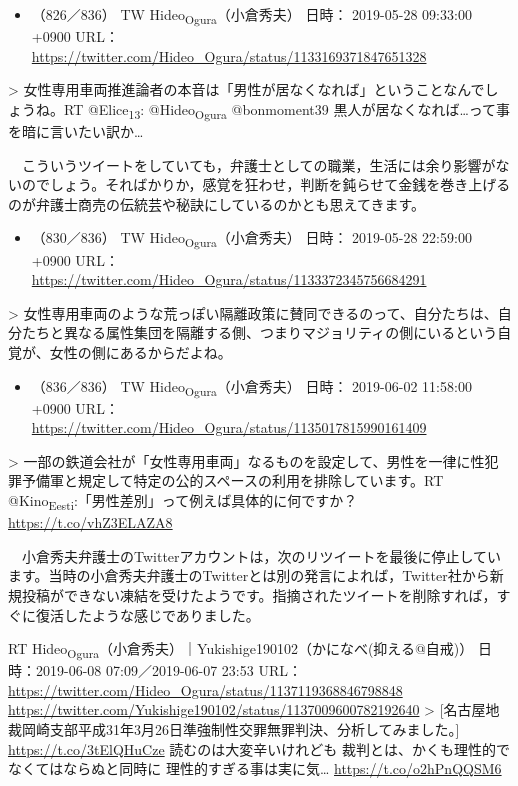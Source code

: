 \documentclass[]{ltjarticle}
\begin{document}
\begin{itemize}
\item （826／836） TW Hideo\textsubscript{Ogura}（小倉秀夫） 日時： 2019-05-28 09:33:00 +0900 URL： \url{https://twitter.com/Hideo\_Ogura/status/1133169371847651328}
\end{itemize}

> 女性専用車両推進論者の本音は「男性が居なくなれば」ということなんでしょうね。RT @Elice\textsubscript{13}: @Hideo\textsubscript{Ogura} @bonmoment39 黒人が居なくなれば…って事を暗に言いたい訳か…

　こういうツイートをしていても，弁護士としての職業，生活には余り影響がないのでしょう。そればかりか，感覚を狂わせ，判断を鈍らせて金銭を巻き上げるのが弁護士商売の伝統芸や秘訣にしているのかとも思えてきます。

\begin{itemize}
\item （830／836） TW Hideo\textsubscript{Ogura}（小倉秀夫） 日時： 2019-05-28 22:59:00 +0900 URL： \url{https://twitter.com/Hideo\_Ogura/status/1133372345756684291}
\end{itemize}

> 女性専用車両のような荒っぽい隔離政策に賛同できるのって、自分たちは、自分たちと異なる属性集団を隔離する側、つまりマジョリティの側にいるという自覚が、女性の側にあるからだよね。

\begin{itemize}
\item （836／836） TW Hideo\textsubscript{Ogura}（小倉秀夫） 日時： 2019-06-02 11:58:00 +0900 URL： \url{https://twitter.com/Hideo\_Ogura/status/1135017815990161409}
\end{itemize}

> 一部の鉄道会社が「女性専用車両」なるものを設定して、男性を一律に性犯罪予備軍と規定して特定の公的スペースの利用を排除しています。RT @Kino\textsubscript{Eesti}:「男性差別」って例えば具体的に何ですか？ \url{https://t.co/vhZ3ELAZA8}

　小倉秀夫弁護士のTwitterアカウントは，次のリツイートを最後に停止しています。当時の小倉秀夫弁護士のTwitterとは別の発言によれば，Twitter社から新規投稿ができない凍結を受けたようです。指摘されたツイートを削除すれば，すぐに復活したような感じでありました。

RT Hideo\textsubscript{Ogura}（小倉秀夫）｜Yukishige190102（かになべ(抑える@自戒)） 日時：2019-06-08 07:09／2019-06-07 23:53 URL： \url{https://twitter.com/Hideo\_Ogura/status/1137119368846798848} \url{https://twitter.com/Yukishige190102/status/1137009600782192640}  
> [名古屋地裁岡崎支部平成31年3月26日準強制性交罪無罪判決、分析してみました。] \url{https://t.co/3tElQHuCze} \n  \n 読むのは大変辛いけれども \n 裁判とは、かくも理性的でなくてはならぬと同時に \n 理性的すぎる事は実に気… \url{https://t.co/o2hPnQQSM6}
\end{document}
